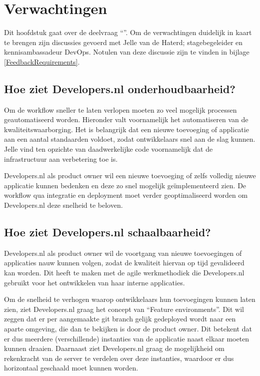 \chapter{Verwachtingen}

\label{Verwachtingen}

Dit hoofdstuk gaat over de deelvraag \enquote{\deelverwachtingen}. Om de verwachtingen duidelijk in kaart te brengen zijn discussies gevoerd met Jelle van de Haterd; stagebegeleider en kennisambassadeur DevOps. Notulen van deze discussie zijn te vinden in bijlage \ref{FeedbackRequirements}.

\section{Hoe ziet Developers.nl onderhoudbaarheid?}

Om de workflow sneller te laten verlopen moeten zo veel mogelijk processen geautomatiseerd worden. Hieronder valt voornamelijk het automatiseren van de kwaliteitswaarborging. Het is belangrijk dat een nieuwe toevoeging of applicatie aan een aantal standaarden voldoet, zodat ontwikkelaars snel aan de slag kunnen. Jelle vind ten opzichte van daadwerkelijke code voornamelijk dat de infrastructuur aan verbetering toe is.

Developers.nl als product owner wil een nieuwe toevoeging of zelfs volledig nieuwe applicatie kunnen bedenken en deze zo snel mogelijk geïmplementeerd zien. De workflow qua integratie en deployment moet verder geoptimaliseerd worden om Developers.nl deze snelheid te beloven.

\section{Hoe ziet Developers.nl schaalbaarheid?}

Developers.nl als product owner wil de voortgang van nieuwe toevoegingen of applicaties nauw kunnen volgen, zodat de kwaliteit hiervan op tijd gevalideerd kan worden. Dit heeft te maken met de agile werkmethodiek die Developers.nl gebruikt voor het ontwikkelen van haar interne applicaties.

Om de snelheid te verhogen waarop ontwikkelaars hun toevoegingen kunnen laten zien, ziet Developers.nl graag het concept van \enquote{Feature environments}. Dit wil zeggen dat er per aangemaakte git branch gelijk gedeployed wordt naar een aparte omgeving, die dan te bekijken is door de product owner. Dit betekent dat er dus meerdere (verschillende) instanties van de applicatie naast elkaar moeten kunnen draaien. Daarnaast ziet Developers.nl graag de mogelijkheid om rekenkracht van de server te verdelen over deze instanties, waardoor er dus horizontaal geschaald moet kunnen worden.

